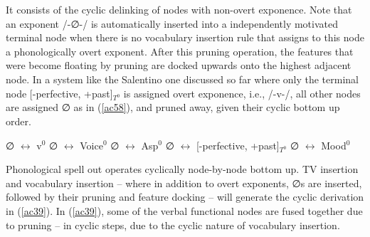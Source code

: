 \documentclass[output=paper]{langscibook}
\begin{document}
It consists of the cyclic delinking of nodes with non-overt exponence. Note that an exponent /-∅-/ is automatically  inserted  into a independently motivated  terminal node when there is no vocabulary insertion rule that assigns to this node a phonologically overt exponent.  After this pruning operation, the features that were become floating by pruning are docked upwards onto the highest adjacent node.  In a system like the Salentino one discussed so far where only the terminal node [-perfective, +past]$_{T^0}$ is assigned overt exponence, i.e., /-v-/, all other nodes are assigned ∅ as in (\ref{ac58}), and pruned away, given their cyclic bottom up order.

\ea \label{ac58}
    \ea ∅ $\longleftrightarrow$ v$^0$
    \ex ∅ $\longleftrightarrow$ Voice$^0$
    \ex ∅ $\longleftrightarrow$ Asp$^0$
    \ex ∅ $\longleftrightarrow$ [-perfective, +past]$_{T^0}$
    \ex ∅ $\longleftrightarrow$ Mood$^0$
    \z
\z

Phonological spell out operates cyclically node-by-node bottom up.  TV insertion and vocabulary insertion -- where in addition to overt exponents, ∅s are inserted, followed by their pruning and feature docking -- will generate the cyclic derivation in (\ref{ac39}). In (\ref{ac39}), some of the verbal functional nodes are fused together due to pruning  --  in cyclic steps, due to the cyclic nature of vocabulary insertion.
\end{document}
